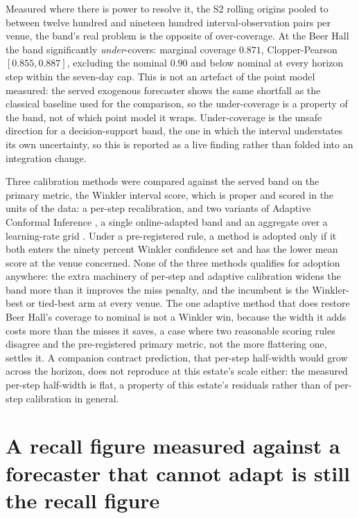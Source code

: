 Measured where there is power to resolve it, the S2 rolling origins pooled to between twelve
hundred and nineteen hundred interval-observation pairs per venue, the band's real problem is
the opposite of over-coverage. At the Beer Hall the band significantly \emph{under}-covers:
marginal coverage $0.871$, Clopper-Pearson $[0.855, 0.887]$, excluding the nominal $0.90$ and
below nominal at every horizon step within the seven-day cap. This is not an artefact of the
point model measured: the served exogenous forecaster shows the same shortfall as the classical
baseline used for the comparison, so the under-coverage is a property of the band, not of which
point model it wraps. Under-coverage is the unsafe direction for a decision-support band, the
one in which the interval understates its own uncertainty, so this is reported as a live finding
rather than folded into an integration change.

Three calibration methods were compared against the served band on the primary metric, the
Winkler interval score, which is proper and scored in the units of the data: a per-step
recalibration, and two variants of Adaptive Conformal Inference \citep{gibbs_adaptive_2021},
a single online-adapted band and an aggregate over a learning-rate grid
\citep{zaffran_adaptive_2022}. Under a pre-registered rule, a method is adopted only if it both
enters the ninety percent Winkler confidence set and has the lower mean score at the venue
concerned. None of the three methods qualifies for adoption anywhere: the extra machinery of
per-step and adaptive calibration widens the band more than it improves the miss penalty, and
the incumbent is the Winkler-best or tied-best arm at every venue. The one adaptive method that
does restore Beer Hall's coverage to nominal is not a Winkler win, because the width it adds
costs more than the misses it saves, a case where two reasonable scoring rules disagree and the
pre-registered primary metric, not the more flattering one, settles it. A companion contract
prediction, that per-step half-width would grow across the horizon, does not reproduce at this
estate's scale either: the measured per-step half-width is flat, a property of this estate's
residuals rather than of per-step calibration in general.

\section{A recall figure measured against a forecaster that cannot adapt is still the recall
figure}
\label{sec:injection-realism}

